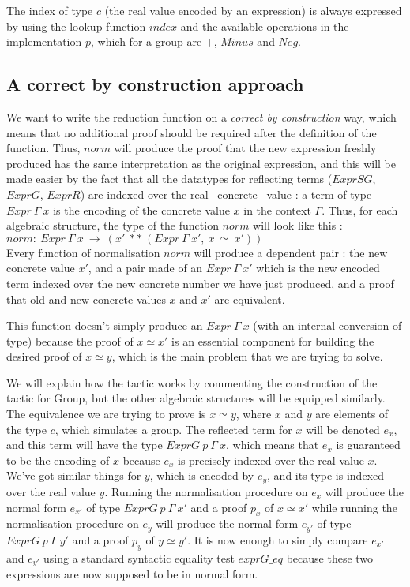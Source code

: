The index of type $c$ (the real value encoded by an expression) is always expressed by using the lookup function $index$ and the available operations in the implementation $p$, which for a group are $+$, $Minus$ and $Neg$.

	\subsection{A correct by construction approach}
\label{sect:correctByConstruction}

We want to write the reduction function on a \emph{correct by construction} way, which means that no additional proof should be required after the definition of the function. Thus, $norm$ will produce the proof that the new expression freshly produced has the same interpretation as the original expression, and this will be made easier by the fact that all the datatypes for reflecting terms ($ExprSG$, $ExprG$, $ExprR$) are indexed over the real --concrete-- value : a term of type $Expr\ \Gamma\ x$ is the encoding of the concrete value $x$ in the context $\Gamma$.
Thus, for each algebraic structure, the type of the function $norm$ will look like this : \\
$norm :\ Expr\ \Gamma\ x\ \rightarrow\ (x'\ **\ (Expr\ \Gamma\ x',\ x\ \simeq\ x'))$ \\
Every function of normalisation $norm$ will produce a dependent pair : the new concrete value $x'$, and a pair made of an $Expr\ \Gamma\ x'$ which is the new encoded term indexed over the new concrete number we have just produced, and a proof that old and new concrete values $x$ and $x'$ are equivalent.

This function doesn't simply produce an $Expr\ \Gamma\ x$ (with an internal conversion of type) because the proof of $x \simeq x'$ is an essential component for building the desired proof of $x \simeq y$, which is the main problem that we are trying to solve.


We will explain how the tactic works by commenting the construction of the tactic for Group, but the other algebraic structures will be equipped similarly. The equivalence we are trying to prove is $x \simeq y$, where $x$ and $y$ are elements of the type $c$, which  simulates a group. The reflected term for $x$ will be denoted $e_x$, and this term will have the type $ExprG\ p\ \Gamma\ x$, which means that $e_x$ is guaranteed to be the encoding of $x$ because $e_x$ is precisely indexed over the real value $x$.
We've got similar things for $y$, which is encoded by $e_y$, and its type is indexed over the real value $y$.
Running the normalisation procedure on $e_x$ will produce the normal form $e_{x'}$ of type $ExprG\ p\ \Gamma\ x'$ and a proof $p_x$ of $x \simeq x'$ while running the normalisation procedure on $e_y$ will produce the normal form $e_{y'}$ of type $ExprG\ p\ \Gamma\ y'$ and a proof $p_y$ of $y \simeq y'$.
It is now enough to simply compare $e_{x'}$ and $e_{y'}$ using a standard syntactic equality test $exprG\_eq$ because these two expressions are now supposed to be in normal form.

